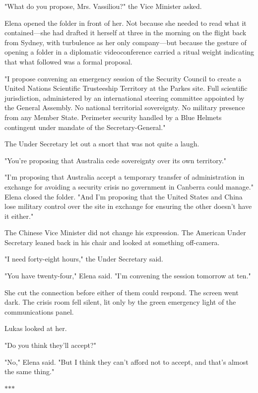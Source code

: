 \documentclass[11pt,a5paper,twoside]{book}
\begin{document}
"What do you propose, Mrs. Vassiliou?" the Vice Minister asked.

Elena opened the folder in front of her. Not because she needed to read what it contained—she had drafted it herself at three in the morning on the flight back from Sydney, with turbulence as her only company—but because the gesture of opening a folder in a diplomatic videoconference carried a ritual weight indicating that what followed was a formal proposal.

"I propose convening an emergency session of the Security Council to create a United Nations Scientific Trusteeship Territory at the Parkes site. Full scientific jurisdiction, administered by an international steering committee appointed by the General Assembly. No national territorial sovereignty. No military presence from any Member State. Perimeter security handled by a Blue Helmets contingent under mandate of the Secretary-General."

The Under Secretary let out a snort that was not quite a laugh.

"You're proposing that Australia cede sovereignty over its own territory."

"I'm proposing that Australia accept a temporary transfer of administration in exchange for avoiding a security crisis no government in Canberra could manage." Elena closed the folder. "And I'm proposing that the United States and China lose military control over the site in exchange for ensuring the other doesn't have it either."

The Chinese Vice Minister did not change his expression. The American Under Secretary leaned back in his chair and looked at something off-camera.

"I need forty-eight hours," the Under Secretary said.

"You have twenty-four," Elena said. "I'm convening the session tomorrow at ten."

She cut the connection before either of them could respond. The screen went dark. The crisis room fell silent, lit only by the green emergency light of the communications panel.

Lukas looked at her.

"Do you think they'll accept?"

"No," Elena said. "But I think they can't afford not to accept, and that's almost the same thing."

\vspace{1.5em}
\begin{center}$\ast$\quad$\ast$\quad$\ast$\end{center}
\vspace{1.5em}
\end{document}
